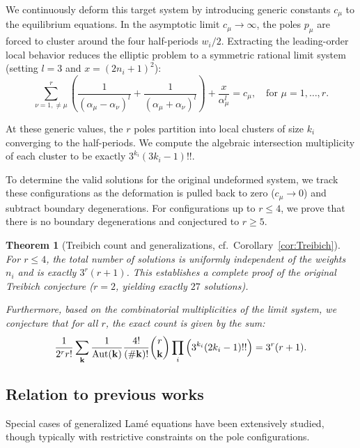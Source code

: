 \documentclass[11pt]{amsart}
\newtheorem{theorem}{Theorem}[section]
\theoremstyle{remark}
\numberwithin{equation}{section}
\begin{document}
We continuously deform this target system by introducing generic constants $c_\mu$ to the equilibrium equations. In the asymptotic limit $c_\mu \to \infty$, the poles $p_\mu$ are forced to cluster around the four half-periods $w_i/2$. Extracting the leading-order local behavior reduces the elliptic problem to a symmetric rational limit system (setting $l = 3$ and $x = (2 n_i + 1)^2$):
\begin{equation} \label{e:Treibich_limit}
\sum_{\nu=1, \neq \mu}^{r} \left( \frac{1}{(\alpha_{\mu} - \alpha_{\nu})^l} + \frac{1}{(\alpha_{\mu} + \alpha_{\nu})^l} \right) + \frac{x}{\alpha_{\mu}^l} = c_{\mu}, \quad \text{for } \mu = 1, \dots, r.
\end{equation}

At these generic values, the $r$ poles partition into local clusters of size $k_i$ converging to the half-periods. We compute the algebraic intersection multiplicity of each cluster to be exactly $3^{k_i}(3k_i - 1)!!$. 

To determine the valid solutions for the original undeformed system, we track these configurations as the deformation is pulled back to zero ($c_\mu \to 0$) and subtract boundary degenerations. For configurations up to $r \leq 4$, we prove that there is no boundary degenerations and conjectured to $r \geq 5$. 

\begin{theorem}[Treibich count and generalizations, cf.~Corollary~\ref{cor:Treibich}]
For $r \leq 4$, the total number of solutions is uniformly independent of the weights $n_i$ and is exactly $3^r(r+1)$. This establishes a complete proof of the original Treibich conjecture ($r=2$, yielding exactly $27$ solutions). 

Furthermore, based on the combinatorial multiplicities of the limit system, we conjecture that for all $r$, the exact count is given by the sum:
\begin{equation}
\frac{1}{2^r r!} \sum_{\mathbf{k}} \frac{1}{{\rm Aut}(\mathbf{k})} \frac{4!}{( \#\mathbf{k})!}  \binom{r}{\mathbf{k}} \prod_i \Big(3^{k_i} (2k_i-1)!!\Big) = 3^r(r+1).
\end{equation}
\end{theorem}



\subsection{Relation to previous works}
Special cases of generalized Lamé equations have been extensively studied, though typically with restrictive constraints on the pole configurations.
\end{document}
